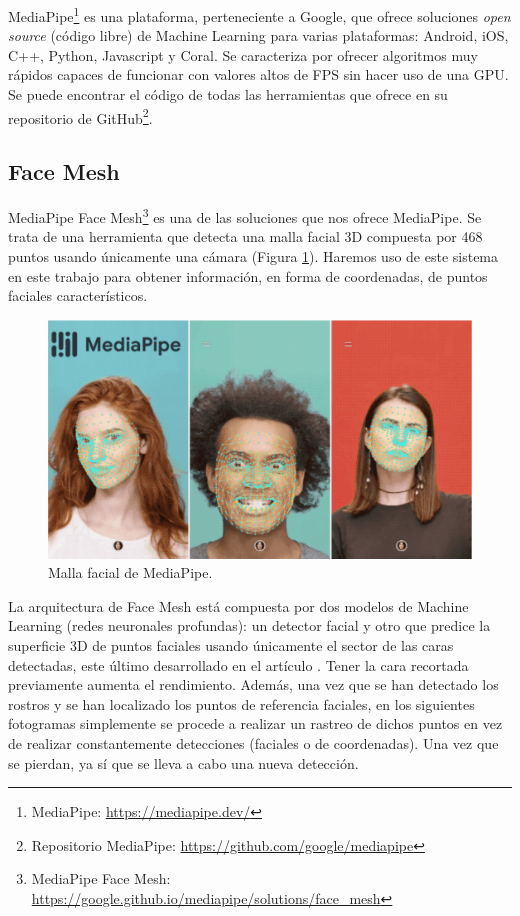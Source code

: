 MediaPipe\footnote{MediaPipe: \url{https://mediapipe.dev/}} es una plataforma, perteneciente a Google, que ofrece soluciones \textit{open source} (código libre) de Machine Learning para varias plataformas: Android, iOS, C++, Python, Javascript y Coral. Se caracteriza por ofrecer algoritmos muy rápidos capaces de funcionar con valores altos de FPS sin hacer uso de una GPU. Se puede encontrar el código de todas las herramientas que ofrece en su repositorio de GitHub\footnote{Repositorio MediaPipe: \url{https://github.com/google/mediapipe}}.

\subsection{Face Mesh}

MediaPipe Face Mesh\footnote{MediaPipe Face Mesh: \url{https://google.github.io/mediapipe/solutions/face_mesh}} es una de las soluciones que nos ofrece MediaPipe. Se trata de una herramienta que detecta una malla facial 3D compuesta por 468 puntos usando únicamente una cámara (Figura \ref{fig:mediapipe}). Haremos uso de este sistema en este trabajo para obtener información, en forma de coordenadas, de puntos faciales característicos.\\

\begin{figure} [h!]
  \begin{center}
    \includegraphics[width=12cm]{figs/mediapipe.png}
  \end{center}
  \caption{Malla facial de MediaPipe.}
  \label{fig:mediapipe}
\end{figure}

La arquitectura de Face Mesh está compuesta por dos modelos de Machine Learning (redes neuronales profundas): un detector facial y otro que predice la superficie 3D de puntos faciales usando únicamente el sector de las caras detectadas, este último desarrollado en el artículo \cite{facemesh_surface}. Tener la cara recortada previamente aumenta el rendimiento. Además, una vez que se han detectado los rostros y se han localizado los puntos de referencia faciales, en los siguientes fotogramas simplemente se procede a realizar un rastreo de dichos puntos en vez de realizar constantemente detecciones (faciales o de coordenadas). Una vez que se pierdan, ya sí que se lleva a cabo una nueva detección.\\

